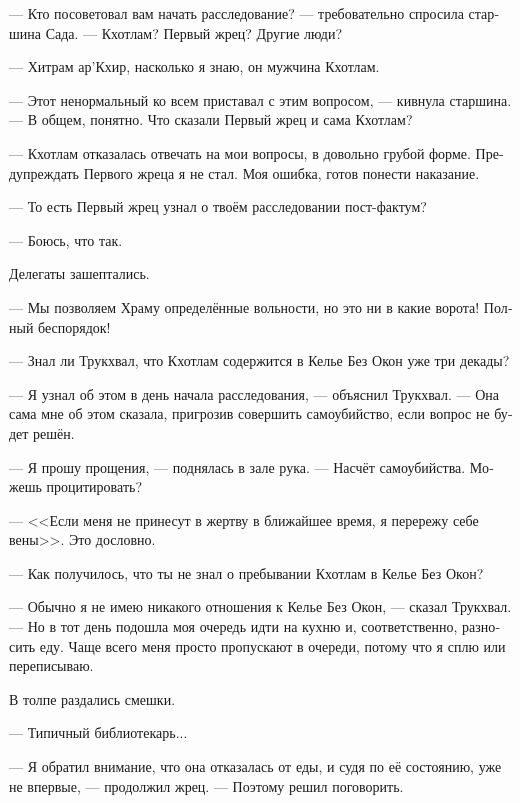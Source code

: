 \documentclass[a4paper,12pt,fleqn]{book}\usepackage{polyglossia}\setdefaultlanguage[babelshorthands=true]{russian}\setotherlanguage{english}\defaultfontfeatures{Ligatures=TeX,Mapping=tex-text}\usepackage{xcolor}\newcommand{\ml}[3]{#2}
\newcommand{\Kchotlam}{Kch\={o}tl\'{a}m}
\newcommand{\Trukchual}{Tr\`{u}kchu\r{a}l}
\begin{document}
--- Кто посоветовал вам начать расследование? --- требовательно спросила старшина Сада.
--- Кхотлам?
Первый жрец?
Другие люди?

--- Хитрам ар'Кхир, насколько я знаю, он мужчина Кхотлам.

--- Этот ненормальный ко всем приставал с этим вопросом, --- кивнула старшина.
\ml{$0$}
{--- В общем, понятно.}
{``That much is clear.}
Что сказали Первый жрец и сама Кхотлам?

\ml{$0$}
{--- Кхотлам отказалась отвечать на мои вопросы, в довольно грубой форме.}
{``\Kchotlam\ refused to answer my questions, in a quite rude manner.}
Предупреждать Первого жреца я не стал.
Моя ошибка, готов понести наказание.

--- То есть Первый жрец узнал о твоём расследовании пост-фактум?

--- Боюсь, что так.

Делегаты зашептались.

--- Мы позволяем Храму определённые вольности, но это ни в какие ворота!
Полный беспорядок!

--- Знал ли Трукхвал, что Кхотлам содержится в Келье Без Окон уже три декады?

--- Я узнал об этом в день начала расследования, --- объяснил Трукхвал.
--- Она сама мне об этом сказала, пригрозив совершить самоубийство, если вопрос не будет решён.

--- Я прошу прощения, --- поднялась в зале рука.
--- Насчёт самоубийства.
Можешь процитировать?

--- <<Если меня не принесут в жертву в ближайшее время, я перережу себе вены>>.
Это дословно.

--- Как получилось, что ты не знал о пребывании Кхотлам в Келье Без Окон?

\ml{$0$}
{--- Обычно я не имею никакого отношения к Келье Без Окон, --- сказал Трукхвал.}
{``Usually I have nothing to do with Windowless Cell,'' \Trukchual\ said.}
--- Но в тот день подошла моя очередь идти на кухню и, соответственно, разносить еду.
Чаще всего меня просто пропускают в очереди, потому что я сплю или переписываю.

В толпе раздались смешки.

\ml{$0$}
{--- Типичный библиотекарь...}
{``A classical librarian ....''}

\ml{$0$}
{--- Я обратил внимание, что она отказалась от еды, и судя по её состоянию, уже не впервые, --- продолжил жрец.}
{``I noticed that she refused to eat, and, given her physical state, not the first time,'' the priest continued.}
\ml{$0$}
{--- Поэтому решил поговорить.}
{``So I decided to talk to her.''}
\end{document}
